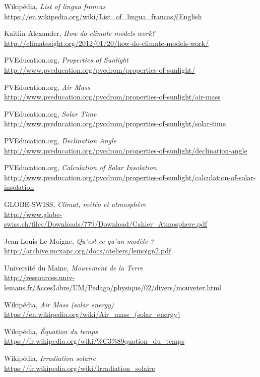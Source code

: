 \documentclass[12pt]{article}
\begin{document}
\begin{thebibliography}{99}

	Wikipédia,
	\emph{List of lingua francas}\\
	\url{https://en.wikipedia.org/wiki/List_of_lingua_francas#English}

	Kaitlin Alexander,
	\emph{How do climate models work?}\\
	\url{http://climatesight.org/2012/01/20/how-do-climate-models-work/}

	PVEducation.org,
	\emph{Properties of Sunlight}\\
	\url{http://www.pveducation.org/pvcdrom/properties-of-sunlight/}

	PVEducation.org,
	\emph{Air Mass}\\
	\url{http://www.pveducation.org/pvcdrom/properties-of-sunlight/air-mass}

	PVEducation.org,
	\emph{Solar Time}\\
	\url{http://www.pveducation.org/pvcdrom/properties-of-sunlight/solar-time}

	PVEducation.org,
	\emph{Declination Angle}\\
	\url{http://www.pveducation.org/pvcdrom/properties-of-sunlight/declination-angle}

	PVEducation.org,
	\emph{Calculation of Solar Insolation}\\
	\url{http://www.pveducation.org/pvcdrom/properties-of-sunlight/calculation-of-solar-insolation}

	GLOBE-SWISS,
	\emph{Climat, météo et atmosphère}\\
	\url{http://www.globe-swiss.ch/files/Downloads/779/Download/Cahier_Atmosphere.pdf}

	Jean-Louis Le Moigne,
	\emph{Qu'est-ce qu'un modèle ?}\\
	\url{http://archive.mcxapc.org/docs/ateliers/lemoign2.pdf}

	Université du Maine,
	\emph{Mouvement de la Terre}\\
	\url{http://ressources.univ-lemans.fr/AccesLibre/UM/Pedago/physique/02/divers/mouveter.html}

	Wikipédia,
	\emph{Air Mass (solar energy)}\\
	\url{https://en.wikipedia.org/wiki/Air_mass_(solar_energy)}

	Wikipédia,
	\emph{Équation du temps}\\
	\url{https://fr.wikipedia.org/wiki/%C3%89quation_du_temps}
	
	Wikipédia,
	\emph{Irradiation solaire}\\
	\url{https://fr.wikipedia.org/wiki/Irradiation_solaire}

\end{thebibliography}
\end{document}
